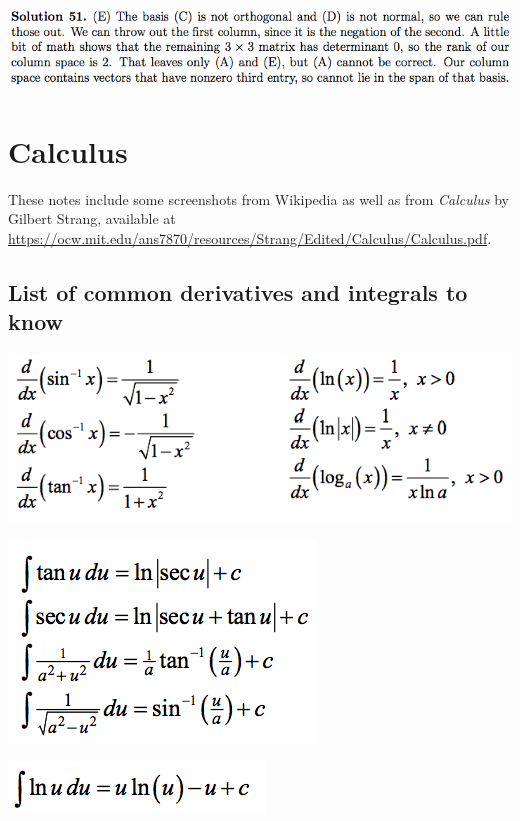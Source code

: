 \documentclass{article}
\begin{document}
\includegraphics[scale=0.65]{1268_51s}

%

\pagebreak

\section{Calculus}

These notes include some screenshots from Wikipedia as well as from \textit{Calculus} by Gilbert Strang, available at \url{https://ocw.mit.edu/ans7870/resources/Strang/Edited/Calculus/Calculus.pdf}.

\subsection{List of common derivatives and integrals to know}

\includegraphics[scale=0.45]{derivatives}

\includegraphics[scale=0.45]{integrals}

\includegraphics[scale=0.45]{integral_ln}
\end{document}
